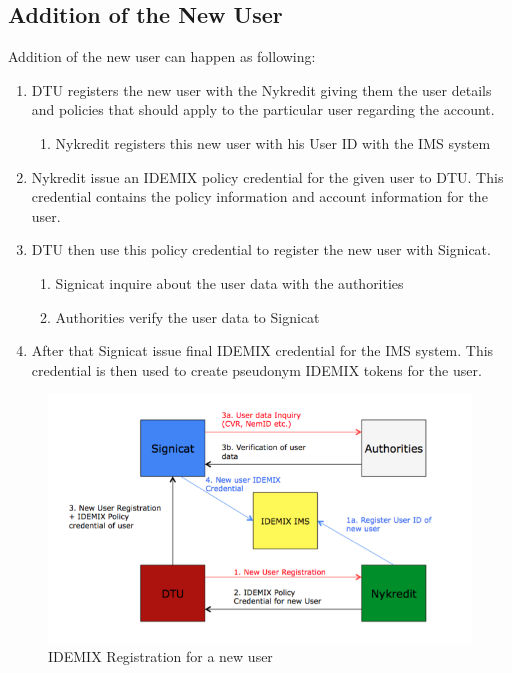 \subsection{Addition of the New User}
Addition of the new user can happen as following:
\begin{enumerate}
	\item DTU registers the new user with the Nykredit giving them the user details and policies that should apply to the particular user regarding the account. 
	\begin{enumerate}
		\item Nykredit registers this new user with his User ID with the IMS system
	\end{enumerate}
	\item Nykredit issue an IDEMIX policy credential for the given user to DTU. This credential contains the policy information and account information for the user.
	\item DTU then use this policy credential to register the new user with Signicat. 
	\begin{enumerate}
		\item Signicat inquire about the user data with the authorities
		\item Authorities verify the user data to Signicat
	\end{enumerate}
	\item After that Signicat issue final IDEMIX credential for the IMS system. This credential is then used to create pseudonym IDEMIX tokens for the user. 
\end{enumerate}
\begin{figure}[h]
	\centering
	\includegraphics[width=\textwidth]{figures/IDEMIX-Real}
	\caption{IDEMIX Registration for a new user}
	\label{fig:IDEMIX-Real}
\end{figure}
